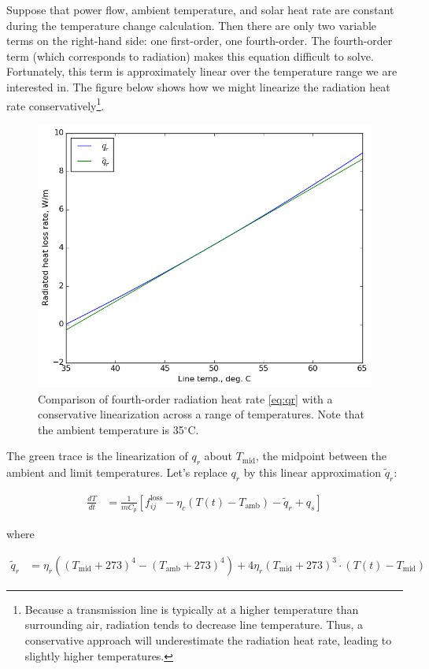 \documentclass{article}
\begin{document}
Suppose that power flow, ambient temperature, and solar heat rate are constant during the temperature change calculation. Then there are only two variable terms on the right-hand side: one first-order, one fourth-order. The fourth-order term (which corresponds to radiation) makes this equation difficult to solve. Fortunately, this term is approximately linear over the temperature range we are interested in. The figure below shows how we might linearize the radiation heat rate conservatively\footnote{Because a transmission line is typically at a higher temperature than surrounding air, radiation tends to decrease line temperature. Thus, a conservative approach will underestimate the radiation heat rate, leading to slightly higher temperatures.}.

\begin{figure}[h]
\centering
\includegraphics[width=0.7\linewidth]{../images/rad_approx}
\caption{Comparison of fourth-order radiation heat rate \eqref{eq:qr} with a conservative linearization across a range of temperatures. Note that the ambient temperature is 35$^\circ$C.}
\label{fig:rad_approx}
\end{figure}

The green trace is the linearization of $q_r$ about $T_\text{mid}$, the midpoint between the ambient and limit temperatures. Let's replace $q_r$ by this linear approximation $\tilde{q}_r$:

\begin{align}\label{eq:approx_qr}
\frac{dT}{dt} &= \frac{1}{mC_p}\left[ f_{ij}^\text{loss} - \eta_c\left( T(t) - T_\text{amb}\right) - \tilde{q}_r + q_s \right]
\end{align}

where

\begin{align}
\tilde{q}_r &= \eta_r  \left( (T_\text{mid} + 273)^4 - (T_\text{amb} + 273)^4\right) + 4\eta_r(T_\text{mid} + 273)^3\cdot(T(t) - T_\text{mid})
\end{align}
\end{document}
